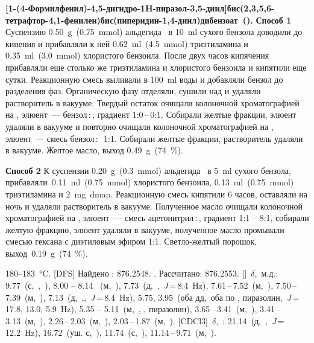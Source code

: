 \textbf{{[1-(4-Формилфенил)-4,5-дигидро-1H-пиразол-3,5-диил]бис(2,3,5,6-тетрафтор-4,1-фенилен)}бис(пиперидин-1,4-диил)дибензоат~().} \textbf{Способ 1} Суспензию \SI{0.50}{\gram}~(\SI{0.75}{\mmol}) альдегида~\textbf{} в \SI{10}{\milli\litre} сухого бензола доводили до кипения и прибавляли к ней \SI{0.62}{\milli\litre}~(\SI{4.5}{\mmol}) триэтиламина и \SI{0.35}{\milli\litre}~(\SI{3.0}{\mmol}) хлористого бензоила. После двух часов кипячения прибавляли еще столько же триэтиламина и хлористого бензоила и кипятили еще сутки. Реакционную смесь выливали в \SI{100}{\milli\litre} воды и добавляли бензол до разделения фаз. Органическую фазу отделяли, сушили над  и удаляли растворитель в вакууме. Твердый остаток очищали колоночной хроматографией на , элюент~--- бензол\,:\,, градиент 1:0\,--\,0:1. Собирали желтые фракции, элюент удаляли в вакууме и повторно очищали колоночной хроматографией на , элюент~--- смесь бензол\,:\,~1:1. Собирали желтые фракции, растворитель удаляли в вакууме. Желтое масло, выход \SI{0.49}{\gram}~(\SI{74}{\percent}).

\textbf{Способ 2} К суспензии \SI{0.20}{\gram}~(\SI{0.3}{\mmol}) альдегида~\textbf{} в \SI{5}{\milli\litre} сухого бензола, прибавляли~\SI{0.11}{\milli\litre}~(\SI{0.75}{\mmol}) хлористого бензоила, \SI{0.13}{\milli\litre}~(\SI{0.75}{\mmol}) триэтиламина и \SI{2}{\milli\gram}~\ac{dmap}.
Реакционную смесь кипятили 6 часов, оставляли на ночь и удаляли растворитель в вакууме.
Полученное масло очищали колоночной хроматографией на , элюент~--- смесь ацетонитрил\,:\,, градиент 1:1 -- 8:1, собирали желтую фракцию, элюент удаляли в вакууме, полученное масло промывали смесью гексана с диэтиловым эфиром 1:1. Светло-желтый порошок, выход~\SI{0.19}{\gram}~(\SI{74}{\percent}).
\begin{experimental}
     180--\SI{183}{\celsius}.
    [DFS] Найдено \ce{[M+]}: \num{876.2548}. . Рассчитано:  \num{876.2553}.
    []~$\delta$,~м.д.: 9.77~(с,~,~), 8.00 -- 8.14 ~(м,~), 7.73~(д,~,~\textit{J}\,=\,8.4~\si{\hertz}), 7.61\,--\,7.52~(м,~), 7.50\,--\,7.39~(м,~), 7.13~(д,~,,~\textit{J}\,=\,8.4~\si{\hertz}), 5.75, 3.95~(оба дд,~оба по , пиразолин,~\textit{J}\,=\,17.8, 13.0, 5.9~\si{\hertz}), 5.35 -- 5.11~(м,~, , пиразолин), 3.65\,--\,3.41~(м,~), 3.41\,--\,3.13~(м,~), 2.26\,--\,2.03~(м,~), 2.03\,--\,1.87~(м,~).
    [CDCl3]~$\delta$,~\si{\ppm}: 21.14~(д,~,~\textit{J}\,=\,12.2~\si{\hertz}), 16.72~(уш. с,~), 11.74~(с,~), 11.14\,--\,9.71~(м,~).
\end{experimental}

